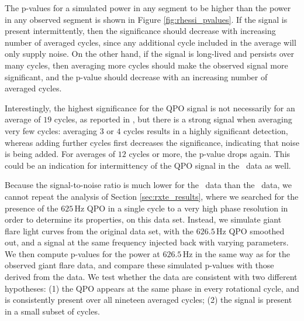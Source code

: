 \documentclass{emulateapj}
\begin{document}
The p-values for a simulated power in any segment to be higher than the power in any observed segment is shown in Figure \ref{fig:rhessi_pvalues}. If the signal is present intermittently, then the significance should decrease with increasing number of averaged cycles, since any additional cycle included in the average will only supply noise. On the other hand, if the signal is long-lived and persists over many cycles, then averaging more cycles should make the observed signal more significant, and the p-value should decrease with an increasing number of averaged cycles.

Interestingly, the highest significance for the QPO signal is not necessarily for an average of $19$ cycles, as reported in \citet{Watts06}, but there is a strong signal when averaging very few cycles: averaging $3$ or $4$ cycles results in a highly significant detection, whereas adding further cycles first decreases the significance, indicating that noise is being added. For averages of $12$ cycles or more, the p-value drops again. This could be an indication for intermittency of the QPO signal in the \rhessi\ data as well.

Because the signal-to-noise ratio is much lower for the \rhessi\ data than the \rxte\ data, we cannot repeat the analysis of Section \ref{sec:rxte_results}, where we searched for the presence of the $625 \, \mathrm{Hz}$ QPO in a single cycle to a very high phase resolution in order to determine its properties, on this data set. Instead, we simulate giant flare light curves from the original data set, with the $626.5 \, \mathrm{Hz}$ QPO smoothed out, and a signal at the same frequency injected back with varying parameters. We then compute p-values for the power at $626.5 \, \mathrm{Hz}$ in the same way as for the observed giant flare data, and compare these simulated p-values with those derived from the data. We test whether the data are consistent with two different hypotheses: (1) the QPO appears at the same phase in every rotational cycle, and is consistently present over all nineteen averaged cycles; (2) the signal is present in a small subset of cycles.
\end{document}

